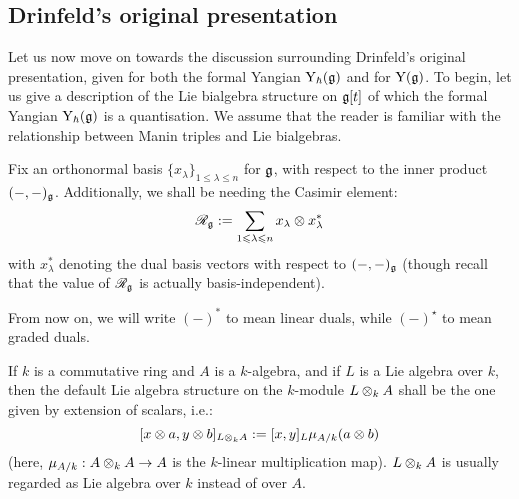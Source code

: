         \subsection{Drinfeld's original presentation}
            Let us now move on towards the discussion surrounding Drinfeld's original presentation, given for both the formal Yangian $\mathrm{Y}_{\hbar}(\mathfrak{g})$ and for $\mathrm{Y}(\mathfrak{g})$. To begin, let us give a description of the Lie bialgebra structure on $\mathfrak{g}[t]$ of which the formal Yangian $\mathrm{Y}_{\hbar}(\mathfrak{g})$ is a quantisation. We assume that the reader is familiar with the relationship between Manin triples and Lie bialgebras.

            \begin{convention}
                Fix an orthonormal basis $\{x_{\lambda}\}_{1 \leq \lambda \leq n}$ for $\mathfrak{g}$, with respect to the inner product $(-, -)_{\mathfrak{g}}$. Additionally, we shall be needing the Casimir element:
                    $$\scrR_{\g} := \sum_{1 \leq \lambda \leq n} x_{\lambda} \tensor x_{\lambda}^*$$
                with $x_{\lambda}^*$ denoting the dual basis vectors with respect to $(-, -)_{\mathfrak{g}}$ (though recall that the value of $\mathscr{R}_{\mathfrak{g}}$ is actually basis-independent).
            \end{convention}
            \begin{convention}
                From now on, we will write $(-)^*$ to mean linear duals, while $(-)^{\star}$ to mean graded duals. 
            \end{convention}
            \begin{convention}
                If $k$ is a commutative ring and $A$ is a $k$-algebra, and if $L$ is a Lie algebra over $k$, then the default Lie algebra structure on the $k$-module $L \tensor_k A$ shall be the one given by extension of scalars, i.e.:
                    $$[x \tensor a, y \tensor b]_{L \tensor_k A} := [x, y]_L \mu_{A/k}(a \tensor b)$$
                (here, $\mu_{A/k}: A \tensor_k A \to A$ is the $k$-linear multiplication map). $L \tensor_k A$ is usually regarded as Lie algebra over $k$ instead of over $A$.  
            \end{convention}
            

